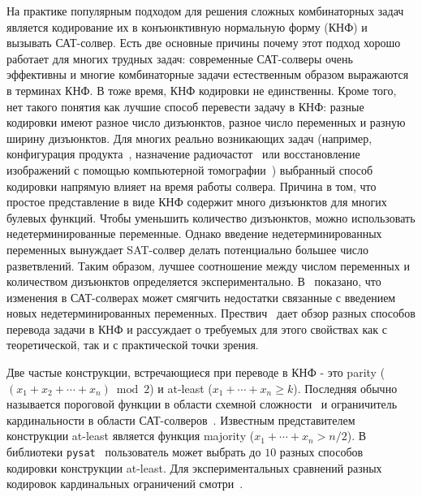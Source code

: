 
На практике популярным подходом для решения сложных комбинаторных задач является кодирование их в конъюнктивную нормальную форму (КНФ) и вызывать САТ-солвер. Есть две основные причины почему этот подход хорошо работает для многих трудных задач: современные САТ-солверы очень эффективны и многие комбинаторные задачи естественным образом выражаются в терминах КНФ. В тоже время, КНФ кодировки не единственны. Кроме того, нет такого понятия как лучшие способ перевести задачу в КНФ: разные кодировки имеют разное число дизъюнктов, разное число переменных и разную ширину дизъюнктов. Для многих реально возникающих задач (например, конфигурация продукта~\cite{ProvingConsistencyAssertions}, назначение радиочастот~\cite{RadioLinkFrequencyAssignment} или восстановление изображений с помощью компьютерной томографии~\cite{EfficientCNFEncodingOfBooleanCardinalityConstraints}) выбранный способ кодировки напрямую влияет на время работы солвера. Причина в том, что простое представление
в виде КНФ содержит много дизъюнктов для многих булевых функций. Чтобы уменьшить количество дизъюнктов,
можно использовать недетерминированные переменные. Однако
введение недетерминированных переменных вынуждает SAT-солвер делать потенциально
большее число разветвлений. Таким образом, лучшее соотношение между числом переменных и количеством дизъюнктов определяется экспериментально\cite{DBLP:series/faia/Prestwich09}. В~\cite{10.1007/978-3-540-74970-7_35} показано, что изменения в САТ-солверах может смягчить недостатки связанные с введением новых недетерминированных  переменных. Прествич~\cite{DBLP:series/faia/Prestwich09} дает обзор разных способов перевода задачи в КНФ и рассуждает о требуемых для этого свойствах как с теоретической, так и с практической точки зрения.

Две частые конструкции, встречающиеся при переводе в КНФ - это parity ($(x_1 +x_2+\dotsb+x_n) \bmod 2$) и  at-least ($x_1+\dotsb+x_n \ge k$). Последняя обычно называется пороговой функции в области схемной сложности~\cite{threshold_function} и ограничитель кардинальности в области САТ-солверов~\cite{10.1007/978-3-540-74970-7_35}.
Известным представителем конструкции at-least является функция majority ($x_1+\dotsb+x_n > n/2$).
В библиотеки \texttt{pysat}~\cite{PySat} пользователь может выбрать до $10$ разных способов кодировки конструкции at-least.
Для экспериментальных сравнений разных кодировок кардинальных ограничений смотри~\cite{Frisch2010SATEO, atmostk,  kochemazov2016comparison}.

